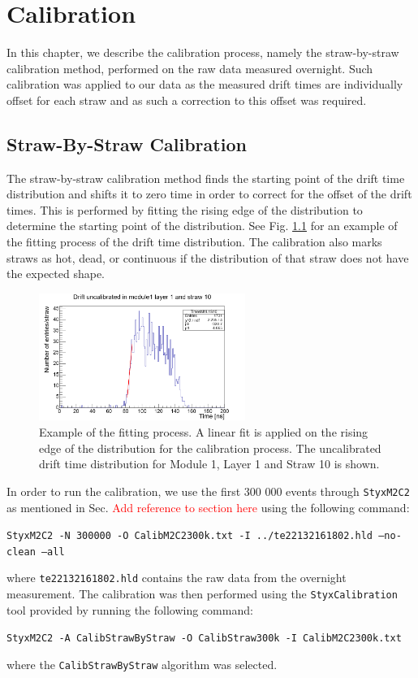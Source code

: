 \documentclass[a4paper]{report}
\numberwithin{equation}{section}
\begin{document}
\chapter{Calibration} \label{chap:calib}

In this chapter, we describe the calibration process, namely the straw-by-straw calibration method, performed 
on the raw data measured overnight. Such calibration was applied to our data as the measured drift times 
are individually offset for each straw and as such a correction to this offset was required.

\section{Straw-By-Straw Calibration}  \label{sec:straw_calib}

The straw-by-straw calibration method finds the starting point of the drift time distribution and shifts it to 
zero time in order to correct for the offset of the drift times. This is performed by fitting the rising edge of the 
distribution to determine the starting point of the distribution. See Fig. \ref{fig:calib_drift_fit} for an example of the fitting process of the 
drift time distribution. The calibration also marks straws as hot, dead, or continuous if the distribution of that straw 
does not have the expected shape. \par 

\begin{figure}[!h]
	\centering
	\includegraphics[width=0.6\textwidth]{calib_drift_m1l1s10_fit.png}
	\caption{Example of the fitting process. A linear fit is applied on the rising edge of the distribution for the calibration process. The uncalibrated drift time distribution
	 for Module 1, Layer 1 and Straw 10 is shown. }
	\label{fig:calib_drift_fit}
\end{figure}

In order to run the calibration, we use the first 300 000 events through \texttt{StyxM2C2} as mentioned in 
Sec. \textcolor{red}{Add reference to section here} using the following command:
\begin{tcolorbox}
	\texttt{StyxM2C2 -N 300000 -O CalibM2C2300k.txt -I ../te22132161802.hld --no-clean --all}
\end{tcolorbox}
where \texttt{te22132161802.hld} contains the raw data from the overnight measurement. The calibration was then performed using the \texttt{StyxCalibration} 
tool provided by running the following command:
\begin{tcolorbox}
	\texttt{StyxM2C2 -A CalibStrawByStraw -O CalibStraw300k -I CalibM2C2300k.txt}
\end{tcolorbox}
where the \texttt{CalibStrawByStraw} algorithm was selected. 
\end{document}
